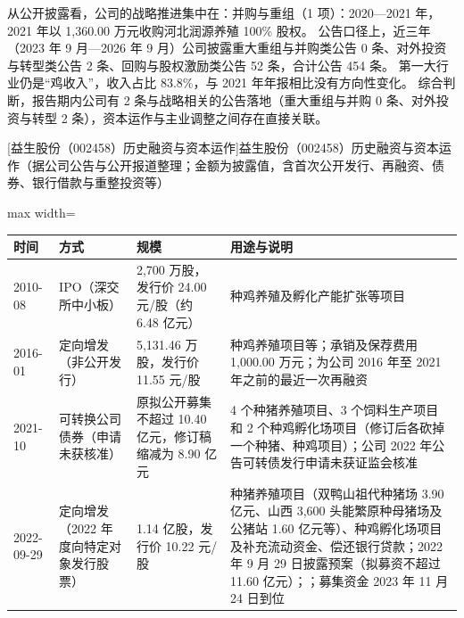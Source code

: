  从公开披露看，公司的战略推进集中在：并购与重组（1 项）：2020---2021 年，2021 年以 1,360.00 万元收购河北润源养殖 100\% 股权。 公告口径上，近三年（2023 年 9 月---2026 年 9 月）公司披露重大重组与并购类公告 0 条、对外投资与转型类公告 2 条、回购与股权激励类公告 52 条，合计公告 454 条。 第一大行业仍是“鸡收入”，收入占比 83.8\%，与 2021 年年报相比没有方向性变化。 综合判断，报告期内公司有 2 条与战略相关的公告落地（重大重组与并购 0 条、对外投资与转型 2 条），资本运作与主业调整之间存在直接关联。

\begin{center}\small\setlength{\tabcolsep}{4pt}
[益生股份（002458）历史融资与资本运作]{益生股份（002458）历史融资与资本运作（据公司公告与公开报道整理；金额为披露值，含首次公开发行、再融资、债券、银行借款与重整投资等）}
\begin{adjustbox}{max width=\textwidth}
\begin{tabular}{@{}p{1.45cm}p{2.55cm}p{4.05cm}p{4.95cm}@{}}
\toprule
时间 & 方式 & 规模 & 用途与说明 \\
\midrule
2010-08 & IPO（深交所中小板） & 2,\allowbreak{}700 万股，\allowbreak{}发行价 24.00 元/\allowbreak{}股（约 6.48 亿元） & 种鸡养殖及孵化产能扩张等项目 \\
2016-01 & 定向增发（非公开发行） & 5,\allowbreak{}131.46 万股，\allowbreak{}发行价 11.55 元/\allowbreak{}股 & 种鸡养殖项目等；承销及保荐费用 1,\allowbreak{}000.00 万元；为公司 2016 年至 2021 年之前的最近一次再融资 \\
2021-10 & 可转换公司债券（申请未获核准） & 原拟公开募集不超过 10.40 亿元，\allowbreak{}修订稿缩减为 8.90 亿元 & 4 个种猪养殖项目、\allowbreak{}3 个饲料生产项目和 2 个种鸡孵化场项目（修订后各砍掉一个种猪、\allowbreak{}种鸡项目）；公司 2022 年公告可转债发行申请未获证监会核准 \\
2022-09-29 & 定向增发（2022 年度向特定对象发行股票） & 1.14 亿股，\allowbreak{}发行价 10.22 元/\allowbreak{}股 & 种猪养殖项目（双鸭山祖代种猪场 3.90 亿元、\allowbreak{}山西 3,\allowbreak{}600 头能繁原种母猪场及公猪站 1.60 亿元等）、\allowbreak{}种鸡孵化场项目及补充流动资金、\allowbreak{}偿还银行贷款；2022 年 9 月 29 日披露预案（拟募资不超过 11.60 亿元）；；募集资金 2023 年 11 月 24 日到位 \\
\bottomrule
\end{tabular}
\end{adjustbox}
\end{center}

